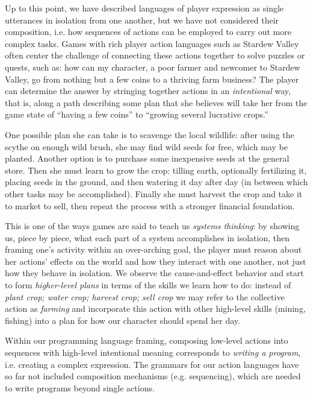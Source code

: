 \documentclass[sigconf]{acmart}
\begin{document}
Up to this point, we have described languages of player expression as
single utterances in isolation from one another, but we have not considered
their composition, i.e. how sequences of actions can be employed to carry out
more complex tasks. Games with rich player action languages such as Stardew
Valley often center the challenge of connecting these actions together to
solve puzzles or quests, such as: how can my character, a poor farmer and
newcomer to Stardew Valley, go from nothing but a few coins to a thriving
farm business? The player can determine the answer by stringing together
actions in an {\em intentional} way, that is, along a path describing some
plan that she believes will take her from the game state of ``having a
few coins'' to ``growing several lucrative crops.''

One possible plan she can take is to scavenge the local wildlife: after
using the scythe on enough wild brush, she may find wild seeds for free,
which may be planted. Another option is to purchase some inexpensive seeds
at the general store. Then she must learn to grow the crop: tilling earth,
optionally fertilizing it, placing seeds in the ground, and then watering
it day after day (in between which other tasks may be accomplished).
Finally she must harvest the crop and take it to market to sell, then
repeat the process with a stronger financial foundation.

This is one of the ways games are said to teach us {\em systems thinking}:
by showing us, piece by piece, what each part of a system accomplishes in
isolation, then framing one's activity within an over-arching goal, the
player must reason about her actions' effects on the world and how they
interact with one another, not just how they behave in isolation. We
observe the cause-and-effect behavior and start to form {\em higher-level
plans} in terms of the skills we learn how to do: instead of {\em plant
crop; water crop; harvest crop; sell crop} we may refer to the collective
action as {\em farming} and incorporate this action with other high-level
skills (mining, fishing) into a plan for how our character should spend her
day.

Within our programming language framing,
composing low-level actions into sequences with high-level intentional
meaning corresponds to {\em writing a program}, i.e. creating a complex
expression. The grammars for our action languages have so far not
included composition mechanisms (e.g. sequencing), which are needed to
write programs beyond single actions.
\end{document}
